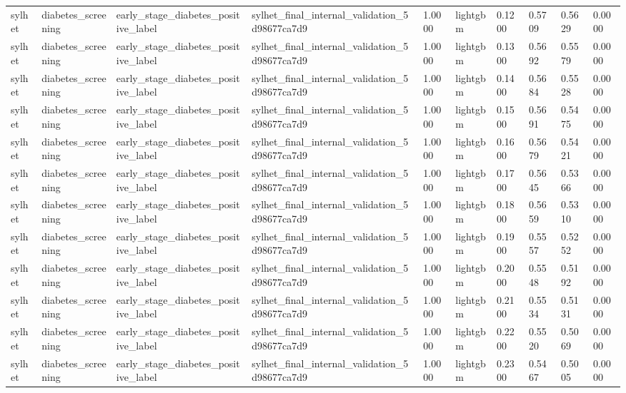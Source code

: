 \begin{tabular}{llllllllll}
sylhet & diabetes\_screening & early\_stage\_diabetes\_positive\_label & sylhet\_final\_internal\_validation\_5d98677ca7d9 & 1.0000 & lightgbm & 0.1200 & 0.5709 & 0.5629 & 0.0000 \\
sylhet & diabetes\_screening & early\_stage\_diabetes\_positive\_label & sylhet\_final\_internal\_validation\_5d98677ca7d9 & 1.0000 & lightgbm & 0.1300 & 0.5692 & 0.5579 & 0.0000 \\
sylhet & diabetes\_screening & early\_stage\_diabetes\_positive\_label & sylhet\_final\_internal\_validation\_5d98677ca7d9 & 1.0000 & lightgbm & 0.1400 & 0.5684 & 0.5528 & 0.0000 \\
sylhet & diabetes\_screening & early\_stage\_diabetes\_positive\_label & sylhet\_final\_internal\_validation\_5d98677ca7d9 & 1.0000 & lightgbm & 0.1500 & 0.5691 & 0.5475 & 0.0000 \\
sylhet & diabetes\_screening & early\_stage\_diabetes\_positive\_label & sylhet\_final\_internal\_validation\_5d98677ca7d9 & 1.0000 & lightgbm & 0.1600 & 0.5679 & 0.5421 & 0.0000 \\
sylhet & diabetes\_screening & early\_stage\_diabetes\_positive\_label & sylhet\_final\_internal\_validation\_5d98677ca7d9 & 1.0000 & lightgbm & 0.1700 & 0.5645 & 0.5366 & 0.0000 \\
sylhet & diabetes\_screening & early\_stage\_diabetes\_positive\_label & sylhet\_final\_internal\_validation\_5d98677ca7d9 & 1.0000 & lightgbm & 0.1800 & 0.5659 & 0.5310 & 0.0000 \\
sylhet & diabetes\_screening & early\_stage\_diabetes\_positive\_label & sylhet\_final\_internal\_validation\_5d98677ca7d9 & 1.0000 & lightgbm & 0.1900 & 0.5557 & 0.5252 & 0.0000 \\
sylhet & diabetes\_screening & early\_stage\_diabetes\_positive\_label & sylhet\_final\_internal\_validation\_5d98677ca7d9 & 1.0000 & lightgbm & 0.2000 & 0.5548 & 0.5192 & 0.0000 \\
sylhet & diabetes\_screening & early\_stage\_diabetes\_positive\_label & sylhet\_final\_internal\_validation\_5d98677ca7d9 & 1.0000 & lightgbm & 0.2100 & 0.5534 & 0.5131 & 0.0000 \\
sylhet & diabetes\_screening & early\_stage\_diabetes\_positive\_label & sylhet\_final\_internal\_validation\_5d98677ca7d9 & 1.0000 & lightgbm & 0.2200 & 0.5520 & 0.5069 & 0.0000 \\
sylhet & diabetes\_screening & early\_stage\_diabetes\_positive\_label & sylhet\_final\_internal\_validation\_5d98677ca7d9 & 1.0000 & lightgbm & 0.2300 & 0.5467 & 0.5005 & 0.0000 \\

\end{tabular}
